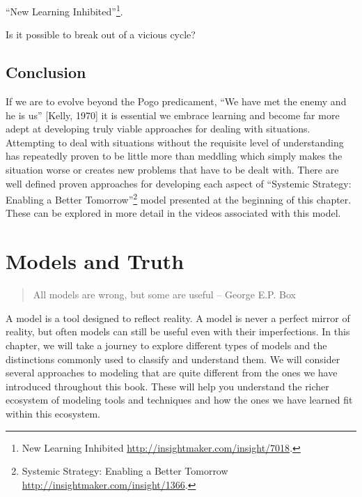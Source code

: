 \documentclass[]{memoir}
\begin{document}
``New Learning Inhibited''\footnote{New Learning Inhibited
  \url{http://insightmaker.com/insight/7018}.}.

\FloatBarrier 

\begin{model}[frametitle={Model: New Learning Inhibited}] 

 Is it possible to break out of a vicious cycle?




 \end{model}

\section{Conclusion}

If we are to evolve beyond the Pogo predicament, ``We have met the enemy
and he is us'' {[}Kelly, 1970{]} it is essential we embrace learning and
become far more adept at developing truly viable approaches for dealing
with situations. Attempting to deal with situations without the
requisite level of understanding has repeatedly proven to be little more
than meddling which simply makes the situation worse or creates new
problems that have to be dealt with. There are well defined proven
approaches for developing each aspect of ``Systemic Strategy: Enabling a
Better Tomorrow''\footnote{Systemic Strategy: Enabling a Better Tomorrow
  \href{http://insightmaker.com/insight/9077}{http://insightmaker.com/insight/1366}.}
model presented at the beginning of this chapter. These can be explored
in more detail in the videos associated with this model.

\chapter{Models and Truth}

\begin{quote}
All models are wrong, but some are useful -- George E.P. Box
\end{quote}

A model is a tool designed to reflect reality. A model is never a
perfect mirror of reality, but often models can still be useful even
with their imperfections. In this chapter, we will take a journey to
explore different types of models and the distinctions commonly used to
classify and understand them. We will consider several approaches to
modeling that are quite different from the ones we have introduced
throughout this book. These will help you understand the richer
ecosystem of modeling tools and techniques and how the ones we have
learned fit within this ecosystem.
\end{document}
